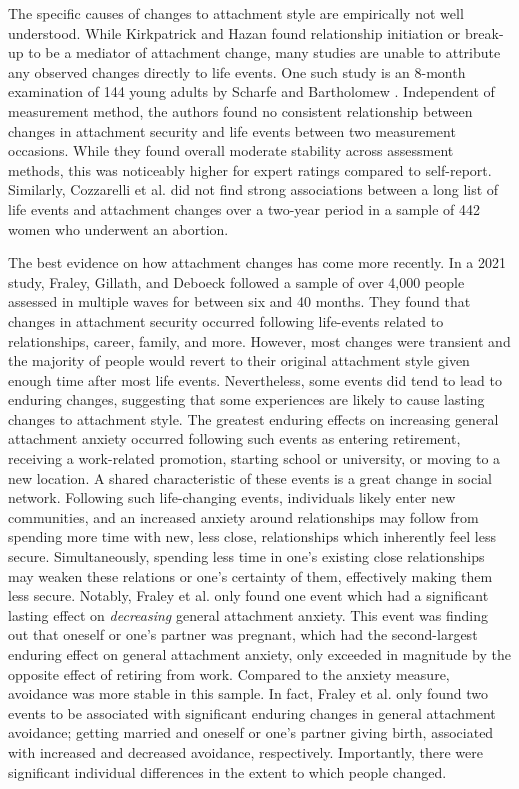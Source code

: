 \documentclass[12pt]{report}
\begin{document}
The specific causes of changes to attachment style are empirically not well understood.
While Kirkpatrick and Hazan \citeyear{Kirkpatrick1994} found relationship initiation or break-up to be a mediator of attachment change, many studies are unable to attribute any observed changes directly to life events.
One such study is an 8-month examination of 144 young adults by Scharfe and Bartholomew \citeyear{Scharfe1994}.
Independent of measurement method, the authors found no consistent relationship between changes in attachment security and life events between two measurement occasions.
While they found overall moderate stability across assessment methods, this was noticeably higher for expert ratings compared to self-report.
Similarly, Cozzarelli et al. \citeyear{Cozzarelli2003} did not find strong associations between a long list of life events and attachment changes over a two-year period in a sample of 442 women who underwent an abortion.

The best evidence on how attachment changes has come more recently. In a 2021 study, Fraley, Gillath, and Deboeck followed a sample of over 4,000 people assessed in multiple waves for between six and 40 months. They found that changes in attachment security occurred following life-events related to relationships, career, family, and more. However, most changes were transient and the majority of people would revert to their original attachment style given enough time after most life events.
Nevertheless, some events did tend to lead to enduring changes, suggesting that some experiences are likely to cause lasting changes to attachment style.
The greatest enduring effects on increasing general attachment anxiety occurred following such events as entering retirement, receiving a work-related promotion, starting school or university, or moving to a new location. A shared characteristic of these events is a great change in social network. Following such life-changing events, individuals likely enter new communities, and an increased anxiety around relationships may follow from spending more time with new, less close, relationships which inherently feel less secure.
Simultaneously, spending less time in one's existing close relationships may weaken these relations or one's certainty of them, effectively making them less secure.
Notably, Fraley et al. only found one event which had a significant lasting effect on \textit{decreasing} general attachment anxiety. This event was finding out that oneself or one's partner was pregnant, which had the second-largest enduring effect on general attachment anxiety, only exceeded in magnitude by the opposite effect of retiring from work.
Compared to the anxiety measure, avoidance was more stable in this sample.
In fact, Fraley et al. only found two events to be associated with significant enduring changes in general attachment avoidance; getting married and oneself or one's partner giving birth, associated with increased and decreased avoidance, respectively.
Importantly, there were significant individual differences in the extent to which people changed.
\end{document}
